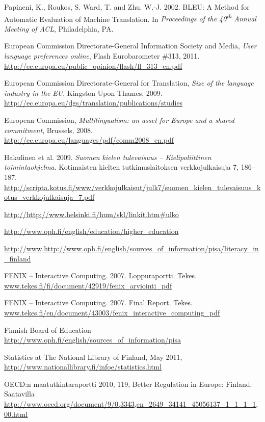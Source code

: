 \documentclass{../../metanetpaper}
\begin{document}
\begin{Parallel}[c]{79mm}{78mm}
\begin{thebibliography}{102}
Papineni, K., Roukos, S. Ward, T. and Zhu. W.-J. 2002.
BLEU: A Method for Automatic Evaluation of Machine Translation.
In \emph{Proceedings of the 40\textsuperscript{th} Annual Meeting of ACL},
Philadelphia, PA.

European Commission Directorate-General Information Society and Media,
\emph{User language preferences online}, Flash Eurobarometer \#313, 2011.
\url{http://ec.europa.eu/public_opinion/flash/fl_313_en.pdf}

European Commission Directorate-General for Translation,
\emph{Size of the language industry in the EU}, Kingston Upon Thames, 2009.
\url{http://ec.europa.eu/dgs/translation/publications/studies}

European Commission,
\emph{Multilingualism: an asset for Europe and a shared commitment},
Brussels, 2008.
\url{http://ec.europa.eu/languages/pdf/comm2008_en.pdf}

Hakulinen et al. 2009.
\emph{Suomen kielen tulevaisuus -- Kielipoliittinen
toimintaohjelma}. Kotimaisten kielten tutkimuslaitoksen verkkojulkaisuja 7,
186–187.
\url{http://scripta.kotus.fi/www/verkkojulkaisut/julk7/suomen_kielen_tulevaisuus_kotus_verkkojulkaisuja_7.pdf}

\url{http://http://www.helsinki.fi/hum/skl/linkit.htm#ulko}

\url{http://www.oph.fi/english/education/higher_education}

\url{http://www.http://www.oph.fi/english/sources_of_information/pisa/literacy_in_finland}

FENIX -- Interactive Computing. 2007. Loppuraportti. Tekes.
\url{www.tekes.fi/fi/document/42919/fenix_arviointi_pdf}

FENIX -- Interactive Computing. 2007. Final Report. Tekes.
\url{www.tekes.fi/en/document/43003/fenix_interactive_computing_pdf}

Finnish Board of Education
\url{http://www.oph.fi/english/sources_of_information/pisa}

Statistics at The National Library of Finland, May 2011,
\url{http://www.nationallibrary.fi/infoe/statistics.html}

OECD:n maatutkintaraportti 2010, 119, Better Regulation in Europe:
Finland. Saatavilla
\url{http://www.oecd.org/document/9/0,3343,en_2649_34141_45056137_1_1_1_1,00.html}


\end{thebibliography}
\end{Parallel}
\end{document}
